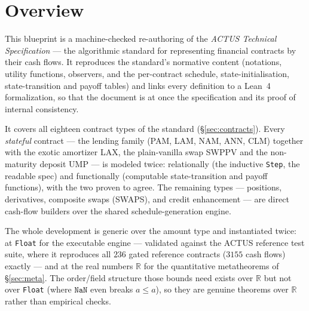 %

\section{Overview}

This blueprint is a machine-checked re-authoring of the \emph{ACTUS Technical
Specification} --- the algorithmic standard for representing financial
contracts by their cash flows.  It reproduces the standard's normative content
(notations, utility functions, observers, and the per-contract schedule,
state-initialisation, state-transition and payoff tables) and links every
definition to a Lean~4 formalization, so that the document is at once the
specification and its proof of internal consistency.

It covers all eighteen contract types of the standard (\S\ref{sec:contracts}).
Every \emph{stateful} contract --- the lending family (PAM, LAM, NAM, ANN, CLM)
together with the exotic amortizer LAX, the plain-vanilla swap SWPPV and the
non-maturity deposit UMP --- is modeled twice: relationally (the inductive
\texttt{Step}, the readable spec) and functionally (computable state-transition
and payoff functions), with the two proven to agree.  The remaining types ---
positions, derivatives, composite swaps (SWAPS), and credit enhancement --- are
direct cash-flow builders over the shared schedule-generation engine.

The whole development is generic over the amount type and instantiated twice:
at \texttt{Float} for the executable engine --- validated against the ACTUS
reference test suite, where it reproduces all $236$ gated reference contracts
($3155$ cash flows) exactly --- and at the real numbers $\mathbb{R}$ for the
quantitative metatheorems of \S\ref{sec:meta}.  The order/field structure those
bounds need exists over $\mathbb{R}$ but not over \texttt{Float} (where
$\mathtt{NaN}$ even breaks $a \le a$), so they are genuine theorems over
$\mathbb{R}$ rather than empirical checks.

